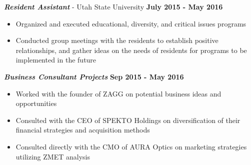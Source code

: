 \documentclass[margin, 10pt]{res} %
\begin{document}
\begin{resume}
\vspace{-.2cm}

{\sl \textbf{Resident Assistant}} - Utah State University \hfill \textbf{July 2015 - May 2016}

\begin{itemize} \itemsep -2pt %
	\item Organized and executed educational, diversity, and critical issues programs
	\item Conducted group meetings with the residents to establish positive relationships, and gather ideas on the needs of residents for programs to be implemented in the future
\end{itemize}

\begin{comment} Commented out engineering internships
\vspace{-.2cm}

{\sl \textbf{Electrical Engineer Intern}}  -  Futura Industries \hfill \textbf{May 2014 - Sep 2014}
\begin{itemize}  \itemsep -2pt %
\item Programmed PLC for quality control and an HMI for heat treat oven interface
\end{itemize} 

\vspace{-.2cm}

{\sl \textbf{Electrical Engineer Intern}}  -  HiTech Control Systems \hfill\textbf{ May 2013 - Sep 2013}
\begin{itemize}  \itemsep -2pt %
\item Programmed and started up stretch wrapping equipment using RSLogix 5000
\item Troubleshooting projects included cheese making system and a water delivery system in cheese making process
\end{itemize}
\end{comment}

\vspace{-.2cm}

{\sl \textbf{Business Consultant Projects}} \hfill \textbf{Sep 2015 - May 2016}
\begin{itemize}  \itemsep -2pt %
	\item Worked with the founder of ZAGG on potential business ideas and opportunities
	\item Consulted with the CEO of SPEKTO Holdings on diversification of their financial strategies and acquisition methods
	\item Consulted directly with the CMO of AURA Optics on marketing strategies utilizing ZMET analysis
\end{itemize}


\end{resume}
\end{document}
